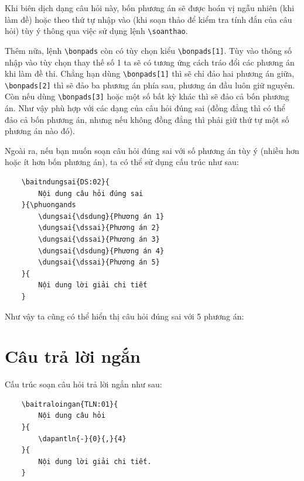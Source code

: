Khi biên dịch dạng câu hỏi này, bốn phương án sẽ được hoán vị ngẫu nhiên (khi làm đề) hoặc theo thứ tự nhập vào (khi soạn thảo để kiểm tra tính đắn của câu hỏi) tùy ý thông qua việc sử dụng lệnh \verb'\soanthao'.

\indebailoigiai
\setcounter{socauhoi}{0}
\begin{enumerate}[]
	\foreachproblem[dungsai]{\item\causo\thisproblem}
\end{enumerate}

Thêm nữa, lệnh \verb'\bonpads' còn có tùy chọn kiểu \verb'\bonpads[1]'. Tùy vào thông số nhập vào tùy chọn thay thế số 1 ta sẽ có tương ứng cách tráo đổi các phương án khi làm đề thi. Chẳng hạn dùng \verb'\bonpads[1]' thì sẽ chỉ đảo hai phương án giữa, \verb'\bonpads[2]' thì sẽ đảo ba phương án phía sau, phương án đầu luôn giữ nguyên. Còn nếu dùng \verb'\bonpads[3]' hoặc một số bất kỳ khác thì sẽ đảo cả bốn phương án. Như vậy phù hợp với các dạng của câu hỏi đúng sai (đồng đẳng thì có thể đảo cả bốn phương án, nhưng nếu không đồng đẳng thì phải giữ thứ tự một số phương án nào đó). 

Ngoài ra, nếu bạn muốn soạn câu hỏi đúng sai với số phương án tùy ý (nhiều hơn hoặc ít hơn bốn phương án), ta có thể sử dụng cấu trúc như sau:

\begin{verbatim}
	\baitndungsai{DS:02}{
		Nội dung câu hỏi đúng sai
	}{\phuongands
		\dungsai{\dsdung}{Phương án 1}
		\dungsai{\dssai}{Phương án 2}
		\dungsai{\dssai}{Phương án 3}
		\dungsai{\dsdung}{Phương án 4}
		\dungsai{\dssai}{Phương án 5}
	}{
		Nội dung lời giải chi tiết
	}
\end{verbatim}

Như vậy ta cũng có thể hiển thị câu hỏi đúng sai với 5 phương án:

\indebailoigiai
\setcounter{socauhoi}{0}
\begin{enumerate}[]
	\foreachproblem[dungsain]{\item\causo\thisproblem}
\end{enumerate}

\section{Câu trả lời ngắn}
Cấu trúc soạn câu hỏi trả lời ngắn như sau:

\begin{verbatim}
	\baitraloingan{TLN:01}{
		Nội dung câu hỏi
	}{
		\dapantln{-}{0}{,}{4}
	}{
		Nội dung lời giải chi tiết.
	}
\end{verbatim}

